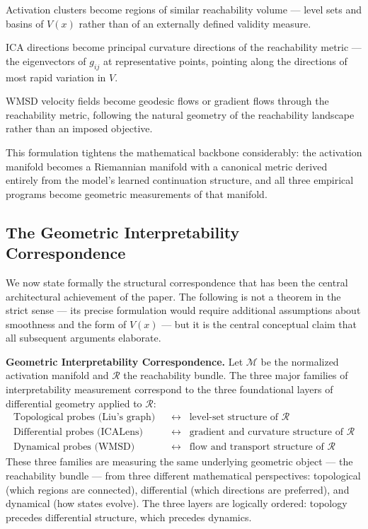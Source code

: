 \documentclass[12pt, a4paper]{article}
\theoremstyle{plain}
\theoremstyle{definition}
\theoremstyle{remark}
\newcommand{\cM}{\mathcal{M}}
\begin{document}
Activation clusters become regions of similar reachability volume --- level
sets and basins of $V(x)$ rather than of an externally defined validity measure.

ICA directions become principal curvature directions of the reachability
metric --- the eigenvectors of $g_{ij}$ at representative points, pointing
along the directions of most rapid variation in $V$.

WMSD velocity fields become geodesic flows or gradient flows through the
reachability metric, following the natural geometry of the reachability
landscape rather than an imposed objective.

This formulation tightens the mathematical backbone considerably: the
activation manifold becomes a Riemannian manifold with a canonical metric
derived entirely from the model's learned continuation structure, and all
three empirical programs become geometric measurements of that manifold.

\subsection{The Geometric Interpretability Correspondence}

We now state formally the structural correspondence that has been the central
architectural achievement of the paper. The following is not a theorem in the
strict sense --- its precise formulation would require additional assumptions
about smoothness and the form of $V(x)$ --- but it is the central conceptual
claim that all subsequent arguments elaborate.

\begin{principleBox}
\textbf{Geometric Interpretability Correspondence.}
Let $\cM$ be the normalized activation manifold and $\mathcal{R}$ the
reachability bundle. The three major families of interpretability measurement
correspond to the three foundational layers of differential geometry applied to
$\mathcal{R}$:
\begin{equation}
\begin{aligned}
  \text{Topological probes (Liu's graph)} &\;\;\longleftrightarrow\;\;
  \text{level-set structure of } \mathcal{R} \\
  \text{Differential probes (ICALens)} &\;\;\longleftrightarrow\;\;
  \text{gradient and curvature structure of } \mathcal{R} \\
  \text{Dynamical probes (WMSD)} &\;\;\longleftrightarrow\;\;
  \text{flow and transport structure of } \mathcal{R}
\end{aligned}
\end{equation}
These three families are measuring the same underlying geometric object ---
the reachability bundle --- from three different mathematical perspectives:
topological (which regions are connected), differential (which directions are
preferred), and dynamical (how states evolve). The three layers are
logically ordered: topology precedes differential structure, which precedes
dynamics.
\end{principleBox}
\end{document}
